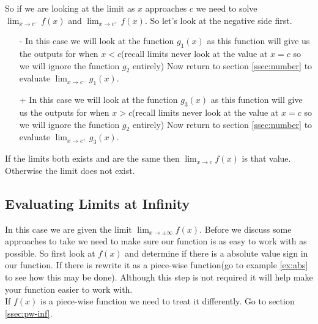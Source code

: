 \documentclass[12pt]{article}
\begin{document}
So if we are looking at the limit as $x$ approaches $c$ we need to solve $\displaystyle{\lim_{x\to c^-}f(x)}$ and $\displaystyle{\lim_{x\to c^+}f(x)}$. So let's look at the negative side first.

\begin{itemize}
    \item[-] In this case we will look at the function $g_1(x)$ as this function will give us the outputs for when $x< c$(recall limits never look at the value at $x=c$ so we will ignore the function $g_2$ entirely) Now return to section \ref{ssec:number} to evaluate $\displaystyle{\lim_{x\to c^-}g_1(x)}$.\\

    \item[+] In this case we will look at the function $g_3(x)$ as this function will give us the outputs for when $x> c$(recall limits never look at the value at $x=c$ so we will ignore the function $g_2$ entirely) Now return to section \ref{ssec:number} to evaluate $\displaystyle{\lim_{x\to c^+}g_3(x)}$.\\
\end{itemize}
If the limits both exists and are the same then $\displaystyle{\lim_{x\to c}f(x)}$ is that value. Otherwise the limit does not exist.



\subsection{Evaluating Limits at Infinity}
\label{ssec:inf}
In this case we are given the limit $\displaystyle{\lim_{x\to \pm\infty}f(x)}$. Before we discuss some approaches to take we need to make sure our function is as easy to work with as possible. So first look at $f(x)$ and determine if there is a absolute value sign in our function. If there is rewrite it as a piece-wise function(go to example \ref{ex:abs} to see how this may be done). Although this step is not required it will help make your function easier to work with.\\

If $f(x)$ is a piece-wise function we need to treat it differently. Go to section \ref{ssec:pw-inf}.
\end{document}
